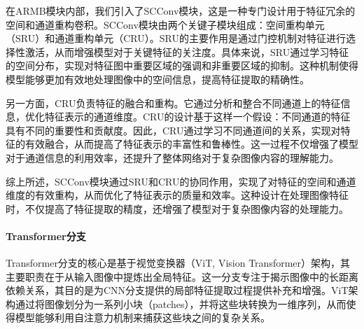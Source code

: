 \documentclass[a4paper]{ctexart}
\begin{document}
%	
%	
	
	在ARMB模块内部，我们引入了SCConv模块，这是一种专门设计用于特征冗余的空间和通道重构卷积。SCConv模块由两个关键子模块组成：空间重构单元（SRU）和通道重构单元（CRU）。SRU的主要作用是通过门控机制对特征进行选择性激活，从而增强模型对于关键特征的关注度。具体来说，SRU通过学习特征的空间分布，实现对特征图中重要区域的强调和非重要区域的抑制。这种机制使得模型能够更加有效地处理图像中的空间信息，提高特征提取的精确性。
	
	另一方面，CRU负责特征的融合和重构。它通过分析和整合不同通道上的特征信息，优化特征表示的通道维度。CRU的设计基于这样一个假设：不同通道的特征具有不同的重要性和贡献度。因此，CRU通过学习不同通道间的关系，实现对特征的有效融合，从而提高了特征表示的丰富性和鲁棒性。这一过程不仅增强了模型对于通道信息的利用效率，还提升了整体网络对于复杂图像内容的理解能力。
	
	综上所述，SCConv模块通过SRU和CRU的协同作用，实现了对特征的空间和通道维度的有效重构，从而优化了特征表示的质量和效率。这种设计在处理图像特征时，不仅提高了特征提取的精度，还增强了模型对于复杂图像内容的处理能力。
	
	\paragraph{Transformer分支}
	
	Transformer分支的核心是基于视觉变换器（ViT, Vision Transformer）架构，其主要职责在于从输入图像中提炼出全局特征。这一分支专注于揭示图像中的长距离依赖关系，其目的是为CNN分支提供的局部特征提取过程提供补充和增强。ViT架构通过将图像划分为一系列小块（patches），并将这些块转换为一维序列，从而使得模型能够利用自注意力机制来捕获这些块之间的复杂关系。
	
\end{document}
